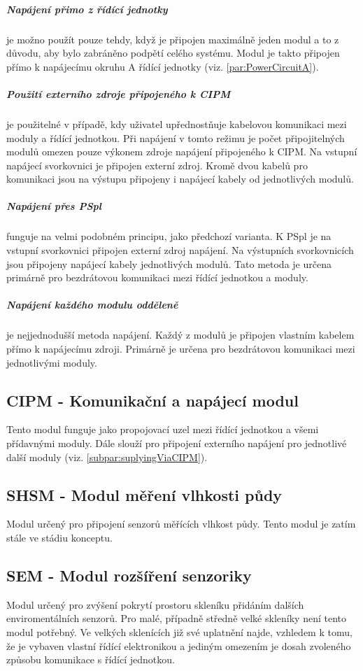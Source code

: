 \subparagraph{Napájení přimo z řídící jednotky}
je možno použít pouze tehdy, když je připojen maximálně jeden modul a to z důvodu, aby bylo zabráněno podpětí celého systému.
Modul je takto připojen přímo k napájecímu okruhu A řídící jednotky (viz. \autoref{par:PowerCircuitA}).

\subparagraph{Použití externího zdroje připojeného k CIPM}
\label{subpar:suplyingViaCIPM}
je použitelné v případě, kdy uživatel upřednostňuje kabelovou komunikaci mezi moduly a řídící jednotkou.
Při napájení v tomto režimu je počet připojitelných modulů omezen pouze výkonem zdroje napájení připojeného k CIPM.
Na vstupní napájecí svorkovnici je připojen externí zdroj. 
Kromě dvou kabelů pro komunikaci jsou na výstupu připojeny i napájecí kabely od jednotlivých modulů.

\subparagraph{Napájení přes PSpl}
funguje na velmi podobném principu, jako předchozí varianta. 
K PSpl je na vstupní svorkovnici připojen externí zdroj napájení.
Na výstupních svorkovnicích jsou připojeny napájecí kabely jednotlivých modulů.
Tato metoda je určena primárně pro bezdrátovou komunikaci mezi řídící jednotkou a moduly.

\subparagraph{Napájení každého modulu odděleně}
je nejjednodušší metoda napájení.
Každý z modulů je připojen vlastním kabelem přímo k napájecímu zdroji.
Primárně je určena pro bezdrátovou komunikaci mezi jednotlivými moduly. 

\subsection{CIPM - Komunikační a napájecí modul}
\label{subsec:CIPM}
Tento modul funguje jako propojovací uzel mezi řídící jednotkou a všemi přídavnými moduly.
Dále slouží pro připojení externího napájení pro jednotlivé další moduly (viz. \autoref{subpar:suplyingViaCIPM}).

\subsection{SHSM - Modul měření vlhkosti půdy}
\label{subsec:SHSM}
Modul určený pro připojení senzorů měřících vlhkost půdy.
Tento modul je zatím stále ve stádiu konceptu.

\subsection{SEM - Modul rozšíření senzoriky}
\label{subsec:SEM}
Modul určený pro zvýšení pokrytí prostoru skleníku přidáním dalších enviromentálních senzorů.
Pro malé, případně středně velké skleníky není tento modul potřebný. 
Ve velkých sklenících již své uplatnění najde, vzhledem k tomu, že je vybaven vlastní řídící elektronikou a jediným omezením je dosah zvoleného způsobu komunikace s řídící jednotkou.

